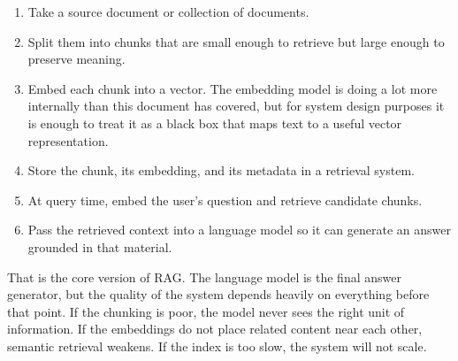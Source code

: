 \documentclass[12pt]{article}
\begin{document}
\begin{enumerate}
    \item Take a source document or collection of documents.
    \item Split them into chunks that are small enough to retrieve but
    large enough to preserve meaning.
    \item Embed each chunk into a vector. The embedding model is doing a
    lot more internally than this document has covered, but for system
    design purposes it is enough to treat it as a black box that maps text
    to a useful vector representation.
    \item Store the chunk, its embedding, and its metadata in a retrieval
    system.
    \item At query time, embed the user's question and retrieve candidate
    chunks.
    \item Pass the retrieved context into a language model so it can
    generate an answer grounded in that material.
\end{enumerate}

That is the core version of RAG. The language model is the final answer
generator, but the quality of the system depends heavily on everything
before that point. If the chunking is poor, the model never sees the
right unit of information. If the embeddings do not place related content
near each other, semantic retrieval weakens. If the index is too slow,
the system will not scale.
\end{document}
